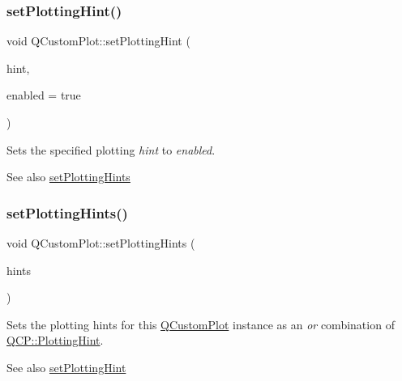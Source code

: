 \subsubsection{\texorpdfstring{set\+Plotting\+Hint()}{setPlottingHint()}}
{\footnotesize\ttfamily void Q\+Custom\+Plot\+::set\+Plotting\+Hint (\begin{DoxyParamCaption}\item[{\mbox{\hyperlink{namespace_q_c_p_a5400e5fcb9528d92002ddb938c1f4ef4}{Q\+C\+P\+::\+Plotting\+Hint}}}]{hint,  }\item[{bool}]{enabled = {\ttfamily true} }\end{DoxyParamCaption})}

Sets the specified plotting {\itshape hint} to {\itshape enabled}.

\begin{DoxySeeAlso}{See also}
\mbox{\hyperlink{class_q_custom_plot_a94a33cbdadbbac5934843508bcfc210d}{set\+Plotting\+Hints}} 
\end{DoxySeeAlso}
\mbox{\label{class_q_custom_plot_a94a33cbdadbbac5934843508bcfc210d}} 
\subsubsection{\texorpdfstring{set\+Plotting\+Hints()}{setPlottingHints()}}
{\footnotesize\ttfamily void Q\+Custom\+Plot\+::set\+Plotting\+Hints (\begin{DoxyParamCaption}\item[{const Q\+C\+P\+::\+Plotting\+Hints \&}]{hints }\end{DoxyParamCaption})}

Sets the plotting hints for this \mbox{\hyperlink{class_q_custom_plot}{Q\+Custom\+Plot}} instance as an {\itshape or} combination of \mbox{\hyperlink{namespace_q_c_p_a5400e5fcb9528d92002ddb938c1f4ef4}{Q\+C\+P\+::\+Plotting\+Hint}}.

\begin{DoxySeeAlso}{See also}
\mbox{\hyperlink{class_q_custom_plot_a3b7c97bb6c16464e9e15190c07abe9a9}{set\+Plotting\+Hint}} 
\end{DoxySeeAlso}
\mbox{\label{class_q_custom_plot_a0c09f96df15faa4799ad7051bb16cf33}} 
